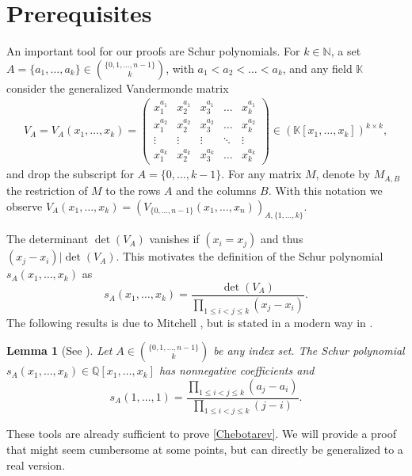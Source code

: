 \documentclass[a4paper]{article}
\newcommand{\N}{\ensuremath{\mathbb{N}}}
\newcommand{\Q}{\ensuremath{\mathbb{Q}}}
\newcommand{\K}{\ensuremath{\mathbb{K}}}
\newtheorem{lemma}[theorem]{Lemma}
\numberwithin{equation}{section}
\numberwithin{table}{section}
\numberwithin{figure}{section}
\begin{document}
\section{Prerequisites}\label{sec:pre}
An important tool for our proofs are Schur polynomials. For $k\in\N$, a set $A=\{a_1,\ldots,a_k\} \in \binom{\{0,1,\ldots,n-1\}}{k}$, with $a_1<a_2<\ldots<a_k$, and any field $\K$ consider the generalized Vandermonde matrix
\begin{align}\label{eq:V}
V_A=V_A(x_1,\ldots,x_k)=
    \begin{pmatrix}
        x_1^{a_1} & x_2^{a_1} & x_3^{a_1} & \ldots & x_k^{a_1}\\
        x_1^{a_2} & x_2^{a_2} & x_3^{a_2} & \ldots & x_k^{a_2}\\
        \vdots & \vdots & \vdots & \ddots & \vdots \\
        x_1^{a_k} & x_2^{a_k} & x_3^{a_k} & \ldots & x_k^{a_k}
    \end{pmatrix}
    \in (\K[x_1,\ldots,x_k])^{k \times k},
\end{align}
and drop the subscript for $A=\{0,\hdots,k-1\}$.
For any matrix $M$, denote by $M_{A,B}$ the restriction of $M$ to the rows $A$ and the columns $B$. With this notation we observe $V_A(x_1,\ldots,x_k)=(V_{\{0,\ldots,n-1\}}(x_1,\ldots,x_n))_{A,\{1,\ldots,k\}}$.


The determinant $\det(V_A)$ vanishes if $(x_i=x_j)$ and thus $(x_j-x_i)| \det(V_A)$. This motivates the definition of the Schur polynomial $s_A(x_1,\ldots,x_k)$ as
\[
s_A(x_1,\ldots,x_k)=\frac{\det(V_A)}{\prod\limits_{1 \leq i < j \leq k}(x_j-x_i)}.
\]
The following results is due to Mitchell \cite{Mitchell}, but is stated in a modern way in \cite{Evans}.
\begin{lemma}[See \cite{Mitchell,Evans}]\label{Schurevaluation}
    Let $A \in \binom{\{0,1,\ldots,n-1\}}{k}$ be any index set. The Schur polynomial $s_A(x_1,\ldots,x_k) \in \Q[x_1,\ldots,x_k]$ has nonnegative coefficients and
    \[
    s_A(1,\ldots,1)=\frac{\prod\limits_{1\leq i < j \leq k}(a_j-a_i)}{\prod\limits_{1\leq i < j \leq k}(j-i)}.
    \]
\end{lemma}

These tools are already sufficient to prove \cref{Chebotarev}. We will provide a proof that might seem cumbersome at some points, but can directly be generalized to a real version.
\end{document}
